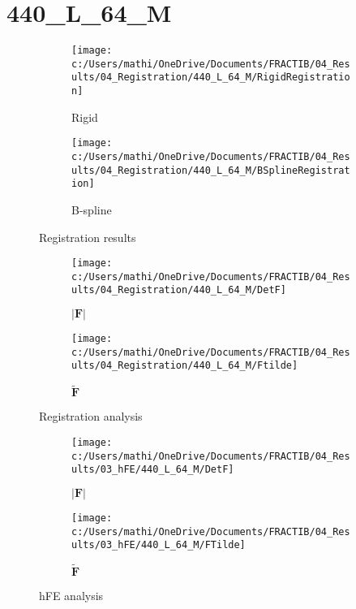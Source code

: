 \documentclass{article}%
\begin{document}
%
\newpage%
\section*{440\_L\_64\_M}%
\label{sec:440L64M}%


\begin{figure}[h!]%
\begin{subfigure}[b]{0.5\linewidth}%
\texttt{[image: c:/Users/mathi/OneDrive/Documents/FRACTIB/04\_Results/04\_Registration/440\_L\_64\_M/RigidRegistration]}%
\caption{Rigid}%
\end{subfigure}%
\begin{subfigure}[b]{0.5\linewidth}%
\texttt{[image: c:/Users/mathi/OneDrive/Documents/FRACTIB/04\_Results/04\_Registration/440\_L\_64\_M/BSplineRegistration]}%
\caption{B{-}spline}%
\end{subfigure}%
\caption{Registration results}%
\end{figure}

%


\begin{figure}[h!]%
\begin{subfigure}[b]{0.5\linewidth}%
\texttt{[image: c:/Users/mathi/OneDrive/Documents/FRACTIB/04\_Results/04\_Registration/440\_L\_64\_M/DetF]}%
\caption{$|\mathbf{F}|$}%
\end{subfigure}%
\begin{subfigure}[b]{0.5\linewidth}%
\texttt{[image: c:/Users/mathi/OneDrive/Documents/FRACTIB/04\_Results/04\_Registration/440\_L\_64\_M/Ftilde]}%
\caption{$\tilde{\mathbf{F}}$}%
\end{subfigure}%
\caption{Registration analysis}%
\end{figure}

%


\begin{figure}[h!]%
\begin{subfigure}[b]{0.5\linewidth}%
\texttt{[image: c:/Users/mathi/OneDrive/Documents/FRACTIB/04\_Results/03\_hFE/440\_L\_64\_M/DetF]}%
\caption{$|\mathbf{F}|$}%
\end{subfigure}%
\begin{subfigure}[b]{0.5\linewidth}%
\texttt{[image: c:/Users/mathi/OneDrive/Documents/FRACTIB/04\_Results/03\_hFE/440\_L\_64\_M/FTilde]}%
\caption{$\tilde{\mathbf{F}}$}%
\end{subfigure}%
\caption{hFE analysis}%
\end{figure}
\end{document}
